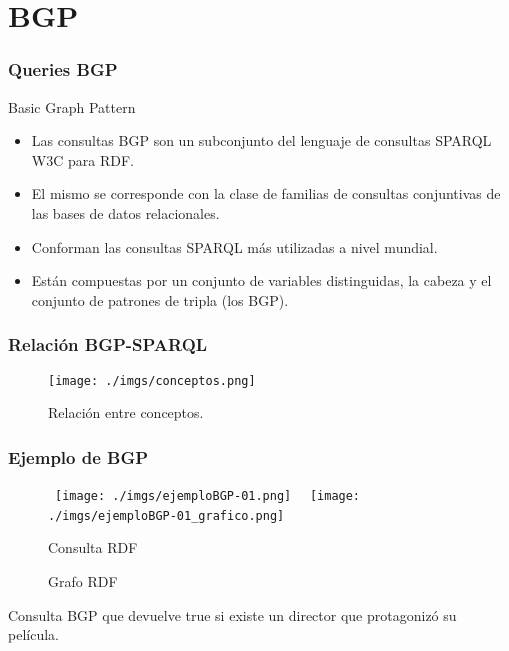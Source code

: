 \documentclass{beamer}
\begin{document}
\section{BGP}
\begin{frame}
\frametitle{Queries BGP}
\begin{exampleblock}{Basic Graph Pattern}
\begin{itemize}
\item<1-> Las consultas BGP son un subconjunto del lenguaje de consultas SPARQL W3C para RDF. 
\item<2-> El mismo se corresponde con la clase de familias de consultas conjuntivas de las bases de datos relacionales. 
\item<3-> Conforman las consultas SPARQL más utilizadas a nivel mundial.
\item<4-> Están compuestas por un conjunto de variables distinguidas, la cabeza y el conjunto de patrones de tripla (los BGP).
\end{itemize}
\end{exampleblock}
\end{frame}

\begin{frame}
\frametitle{Relación BGP-SPARQL}
\begin{figure}[H] %
\begin{center}
\texttt{[image: ./imgs/conceptos.png]}
\caption{Relación entre conceptos.}
\end{center}
\end{figure}
\end{frame}
\begin{frame}
\frametitle{Ejemplo de BGP}
\begin{figure}
        \hbox{%
                \texttt{[image: ./imgs/ejemploBGP-01.png]}%
        }%
        \hbox{%
                \texttt{[image: ./imgs/ejemploBGP-01\_grafico.png]}%
        }%
        \ifdim\ht0>\ht2
                \setbox0\hbox{%
                        \texttt{[image: ./imgs/ejemploBGP-01.png]}%
                }%
        \else
                \setbox2\hbox{%
                        \texttt{[image: ./imgs/ejemploBGP-01\_grafico.png]}%
                }%
        \fi
        \noindent
        \parbox{.35\textwidth}{%
                \centering
                \caption{Consulta RDF}
                \label{fg:methods}
        }%
        \hfil
        \parbox{.35\textwidth}{%
                \centering
                \caption{Grafo RDF}
                \label{fg:method_detail}
        }
\end{figure}
\vspace*{1.2cm}
Consulta BGP que devuelve true si existe un director que protagonizó su película.
\end{frame}
\end{document}
